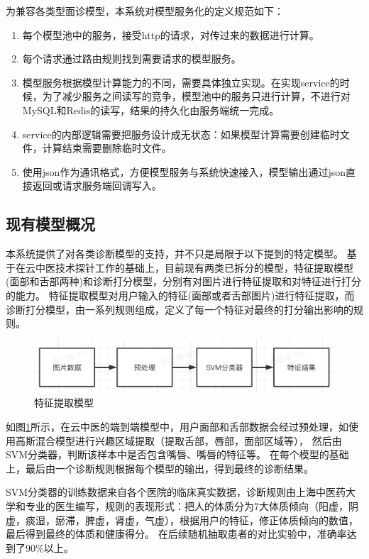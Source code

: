 为兼容各类型面诊模型，本系统对模型服务化的定义规范如下：
\begin{enumerate}
    \item 每个模型池中的服务，接受http的请求，对传过来的数据进行计算。
    \item 每个请求通过路由规则找到需要请求的模型服务。
    \item 模型服务根据模型计算能力的不同，需要具体独立实现。在实现service的时候，为了减少服务之间读写的竞争，模型池中的服务只进行计算，不进行对MySQL和Redis的读写，结果的持久化由服务端统一完成。
    \item service的内部逻辑需要把服务设计成无状态：如果模型计算需要创建临时文件，计算结束需要删除临时文件。
    \item 使用json作为通讯格式，方便模型服务与系统快速接入，模型输出通过json直接返回或请求服务端回调写入。
\end{enumerate}

\subsection{现有模型概况}
本系统提供了对各类诊断模型的支持，并不只是局限于以下提到的特定模型。
基于在云中医技术探针工作的基础上，目前现有两类已拆分的模型，特征提取模型(面部和舌部两种)和诊断打分模型，分别有对图片进行特征提取和对特征进行打分的能力。
特征提取模型对用户输入的特征(面部或者舌部图片)进行特征提取，而诊断打分模型，由一系列规则组成，定义了每一个特征对最终的打分输出影响的规则。

\begin{figure}[ht]
    \centering
    \includegraphics[width=15cm]{images/model.png}
    \caption{特征提取模型}
    \label{fig:my_model}
\end{figure}

如图\ref{fig:my_model}所示，在云中医的端到端模型中，用户面部和舌部数据会经过预处理，如使用高斯混合模型进行兴趣区域提取（提取舌部，唇部，面部区域等），
然后由SVM分类器，判断该样本中是否包含嘴唇、嘴唇的特征等。
在每个模型的基础上，最后由一个诊断规则根据每个模型的输出，得到最终的诊断结果。

SVM分类器的训练数据来自各个医院的临床真实数据，诊断规则由上海中医药大学和专业的医生编写，规则的表现形式：把人的体质分为7大体质倾向（阳虚，阴虚，痰湿，瘀滞，脾虚，肾虚，气虚），根据用户的特征，修正体质倾向的数值，最后得到最终的体质和健康得分。
在后续随机抽取患者的对比实验中，准确率达到了90\%以上。

